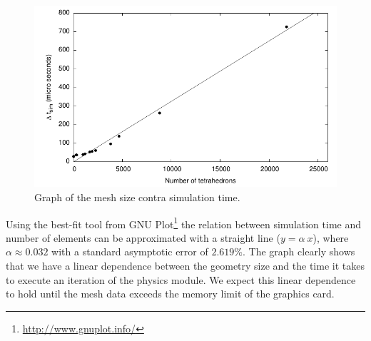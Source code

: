 \begin{figure}
  \centering
  \includegraphics[width=140mm]{./images/results_time_contra_mesh_size.pdf}
  \caption{Graph of the mesh size contra simulation time.}
  \label{fig:time-contra-mesh-size-graph}
\end{figure}

Using the best-fit tool from GNU
Plot\footnote{\url{http://www.gnuplot.info/}} the relation between
simulation time and number of elements can be approximated with a
straight line ($y = \alpha \ x$), where $\alpha \approx 0.032$
with a standard asymptotic error of $2.619\%$.
%
%
%
%
%
%
The graph clearly shows that we have a linear dependence
between the geometry size and the time it takes to execute an iteration
of the physics module. We expect this linear dependence to hold until
the mesh data exceeds the memory limit of the graphics card.


